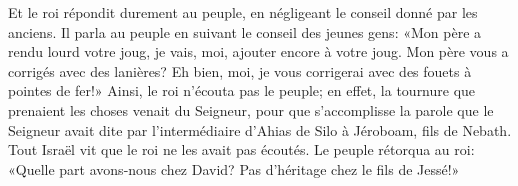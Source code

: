 Et le roi répondit durement au peuple, en négligeant le conseil donné par les anciens.
Il parla au peuple en suivant le conseil des jeunes gens:
	«Mon père a rendu lourd votre joug, je vais, moi, ajouter encore à votre joug.
Mon père vous a corrigés avec des lanières?
	Eh bien, moi, je vous corrigerai avec des fouets à pointes de fer!»
Ainsi, le roi n’écouta pas le peuple;
	en effet, la tournure que prenaient les choses venait du Seigneur,
	pour que s’accomplisse la parole que le Seigneur avait dite
		par l’intermédiaire d’Ahias de Silo
		à Jéroboam, fils de Nebath.
Tout Israël vit que le roi ne les avait pas écoutés.
Le peuple rétorqua au roi:
		«Quelle part avons-nous chez David?
	Pas d’héritage chez le fils de Jessé!»
